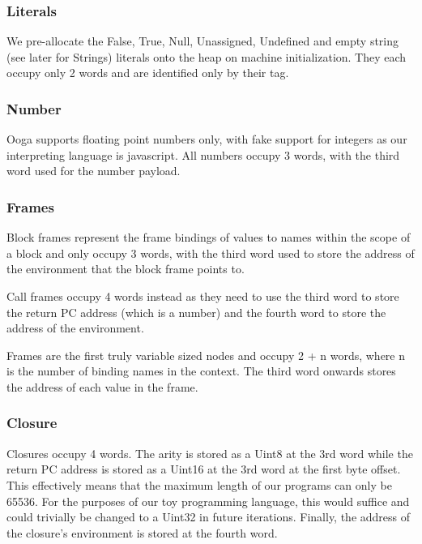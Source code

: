 \documentclass{report}
\begin{document}
\subsubsection{Literals}

We pre-allocate the False, True, Null, Unassigned, Undefined and empty string (see later for Strings) literals onto the heap on machine initialization. They each occupy only 2 words and are identified only by their tag.

\subsubsection{Number}

Ooga supports floating point numbers only, with fake support for integers as our interpreting language is javascript. All numbers occupy 3 words, with the third word used for the number payload.

\subsubsection{Frames}

Block frames represent the frame bindings of values to names within the scope of a block and only occupy 3 words, with the third word used to store the address of the environment that the block frame points to.

Call frames occupy 4 words instead as they need to use the third word to store the return PC address (which is a number) and the fourth word to store the address of the environment.

Frames are the first truly variable sized nodes and occupy 2 + n words, where n is the number of binding names in the context. The third word onwards stores the address of each value in the frame.

\subsubsection{Closure}

Closures occupy 4 words. The arity is stored as a Uint8 at the 3rd word while the return PC address is stored as a Uint16 at the 3rd word at the first byte offset. This effectively means that the maximum length of our programs can only be 65536. For the purposes of our toy programming language, this would suffice and could trivially be changed to a Uint32 in future iterations. Finally, the address of the closure's environment is stored at the fourth word. 
\end{document}
